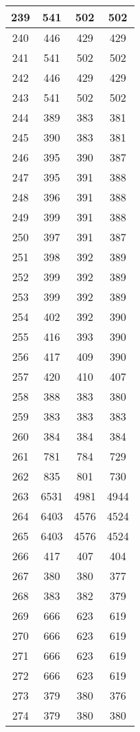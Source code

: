 \begin{table}[H]
\begin{tabular}{|c|c|c|c|}
\hline
239 & 541 & 502 & 502 \\
\hline
240 & 446 & 429 & 429 \\
\hline
241 & 541 & 502 & 502 \\
\hline
242 & 446 & 429 & 429 \\
\hline
243 & 541 & 502 & 502 \\
\hline
244 & 389 & 383 & 381 \\
\hline
245 & 390 & 383 & 381 \\
\hline
246 & 395 & 390 & 387 \\
\hline
247 & 395 & 391 & 388 \\
\hline
248 & 396 & 391 & 388 \\
\hline
249 & 399 & 391 & 388 \\
\hline
250 & 397 & 391 & 387 \\
\hline
251 & 398 & 392 & 389 \\
\hline
252 & 399 & 392 & 389 \\
\hline
253 & 399 & 392 & 389 \\
\hline
254 & 402 & 392 & 390 \\
\hline
255 & 416 & 393 & 390 \\
\hline
256 & 417 & 409 & 390 \\
\hline
257 & 420 & 410 & 407 \\
\hline
258 & 388 & 383 & 380 \\
\hline
259 & 383 & 383 & 383 \\
\hline
260 & 384 & 384 & 384 \\
\hline
261 & 781 & 784 & 729 \\
\hline
262 & 835 & 801 & 730 \\
\hline
263 & 6531 & 4981 & 4944 \\
\hline
264 & 6403 & 4576 & 4524 \\
\hline
265 & 6403 & 4576 & 4524 \\
\hline
266 & 417 & 407 & 404 \\
\hline
267 & 380 & 380 & 377 \\
\hline
268 & 383 & 382 & 379 \\
\hline
269 & 666 & 623 & 619 \\
\hline
270 & 666 & 623 & 619 \\
\hline
271 & 666 & 623 & 619 \\
\hline
272 & 666 & 623 & 619 \\
\hline
273 & 379 & 380 & 376 \\
\hline
274 & 379 & 380 & 380 \\

\end{tabular}
\end{table}
